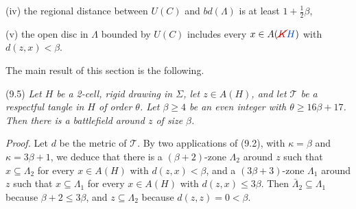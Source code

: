 \hspace*{12pt}(iv) the regional distance between $U(C)$ and $bd(\Lambda)$ is at least $1 + \frac{1}{2}\beta$,

\hspace*{12pt}(v) the open disc in $\Lambda$ bounded by $U(C)$ includes every $x \in A(\delm{K}\fix{H})$ with $d(z, x) < \beta$.

The main result of this section is the following.

\stmt
(9.5) \textit{Let $H$ be a 2-cell, rigid drawing in $\Sigma$, let $z \in A(H)$, and let $\mathscr{T}$ be a respectful tangle in $H$ of order $\theta$. Let $\beta \ge 4$ be an even integer with $\theta \ge 16\beta + 17$. Then there is a battlefield around $z$ of size $\beta$.}

\textit{Proof.} Let $d$ be the metric of $\mathscr{T}$. By two applications of (9.2), with $\kappa = \beta$ and $\kappa = 3\beta + 1$, we deduce that there is a $(\beta + 2)$-zone $\Lambda_2$ around $z$ such that $x \subseteq \Lambda_2$ for every $x \in A(H)$ with $d(z, x) < \beta$, and a $(3\beta + 3)$-zone $\Lambda_1$ around $z$ such that $x \subseteq \Lambda_1$ for every $x \in A(H)$ with $d(z, x) \le 3\beta$. Then $\bar{\Lambda}_2 \subseteq \Lambda_1$ because $\beta + 2 \le 3\beta$, and $z \subseteq \Lambda_2$ because $d(z, z) = 0 < \beta$.
